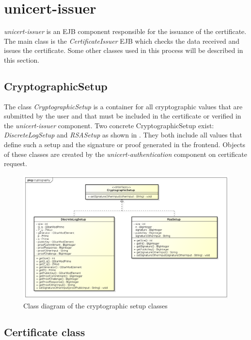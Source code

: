 \documentclass[oneside]{scrreprt}
\begin{document}
\section{unicert-issuer}

\textit{unicert-issuer} is an EJB component responsible for the issuance of the certificate. The main class is the \textit{CertificateIssuer} EJB which checks the data received and issues the certificate. Some other classes used in this process will be described in this section.

\subsection{CryptographicSetup}

The class \textit{CryptographicSetup} is a container for all cryptographic values that are submitted by the user and that must be included in the certificate or verified in the \textit{unicert-issuer} component. Two concrete CryptographicSetup exist: \textit{DiscreteLogSetup} and \textit{RSASetup} as shown in . They both include all values that define such a setup and the signature or proof generated in the frontend. Objects of these classes are created by the \textit{unicert-authentication} component on certificate request.

\begin{figure}[ht]
\centerline{
\includegraphics[width=\textwidth]{figs/cryptographic_setup_class_diagram.png}}
\caption{Class diagram of the cryptographic setup classes}
\label{fig:cryptographic_setup_class_diagram}
\end{figure}

\subsection{Certificate class}
\end{document}
